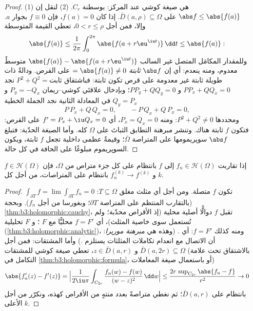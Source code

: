 \begin{proof}
(1) هي صيغة كوشي عند المركز: بوسطنة $C_r$.
(2) لنقل إن $\abs f \leq \abs{f(a)}$ على $\bar D(a, \rho)
\subseteq \Omega$. إذا كان $f(a) = 0$، فإن
$f \equiv 0$ بجوار $a$. وإلا، فمن أجل $0 < r \leq \rho$، تعطي القيمة
المتوسطة
\[
\abs{f(a)} \leq \frac1{2\pi}\int_0^{2\pi}\abs{f(a +
r\eu^{\iu t})}\,\dd t \leq \abs{f(a)} :
\]
وللمقدار المكامَل المتصل غير السالب $\abs{f(a)} - \abs{f(a +
r\eu^{\iu t})}$ متوسطٌ معدوم، ومنه
ينعدم: أي إن $\abs f$ \emph{ثابتة} $= \abs{f(a)} \ne 0$ على القرص. ودالةٌ
 ذات طويلة ثابتة غير معدومة على قرص تكون ثابتة:
فباشتقاق $P^2 + Q^2 = \text{ثابت}$ نجد $PP_x + QQ_x
= 0$ و $PP_y + QQ_y = 0$؛ وبإدخال علاقتَي
كوشي--ريمان $P_y = -Q_x$ و $Q_y = P_x$ في المعادلة الثانية نجد
الجملة الخطية
\[
P\,P_x + Q\,Q_x = 0, \qquad -P\,Q_x + Q\,P_x = 0,
\]
ومحددها $P^2 + Q^2 \neq 0$: ومنه $P_x = Q_x = 0$، أي $f' = P_x + \iu Q_x = 0$ على القرص:
فتكون $f$ ثابتة هناك. وتنشر مبرهنة التطابق الثباتَ على $\Omega$
كله. وأما الصيغة الحدّية: فتبلغ $\abs f$ سوپريمومها على
المتراصة $\bar\Omega$؛ وقيمةٌ عظمى داخلية تجعل $f$ ثابتة،
ويكون السوپريموم مبلوغًا على الحافة في كل حالة.
\end{proof}

\begin{theorem}
\label{thm:b3:holomorphic:weierstrassconv}
إذا تقاربت $f_n \in \mathcal H(\Omega)$ إلى $f$ بانتظام على كل جزء متراص من
$\Omega$، فإن $f \in \mathcal
H(\Omega)$ و $f_n^{(k)} \to f^{(k)}$ بانتظام على المتراصات، من أجل
كل $k$.
\end{theorem}

\begin{proof}
تكون $f$ متصلة. ومن أجل أي مثلث مغلق $T \subseteq
\Omega$: $\int_{\partial T}f = \lim\int_{\partial T}f_n = 0$ (بالتقارب
المنتظم على المتراصة $\partial T$؛ وبغورسا من أجل $f_n$). وبحجة
\cref{thm:b3:holomorphic:cauchy}، تقبل $f$ دوالًّا أصلية محلية (إذ الأقراص محدّبة؛
ولم تُستعمل سوى خاصية المثلث)، أي $f = F'$ محليًّا مع $F$
؛ و $F$ تحليلية (\cref{thm:b3:holomorphic:analytic})، ومنه كذلك $f = F'$:
أي . (وهذه هي \emph{مبرهنة موريرا}: أن الاتصال مع انعدام تكاملات المثلثات يستلزم
.) وأما المشتقات: فمن أجل $\bar D(a, 2r) \subseteq \Omega$ و $z \in \bar D(a, r)$، تعطي
صيغة كوشي للمشتقات (بالاشتقاق تحت علامة التكامل في \cref{thm:b3:holomorphic:formula}،
أو باستعمال صيغة المعاملات)
\[
\abs{f_n'(z) - f'(z)} =
\Bigl|\frac{1}{2\iu\pi}\int_{C_{2r}}\frac{f_n(w) - f(w)}{(w -
z)^2}\,\dd w\Bigr|
\leq \frac{2r\,\sup_{C_{2r}}\abs{f_n - f}}{r^2} \to 0
\]
بانتظام على $\bar D(a,r)$؛ ثم نغطي متراصةً بعدد منتهٍ من
الأقراص كهذه، ونكرّر من أجل $k$ الأعلى.
\end{proof}

